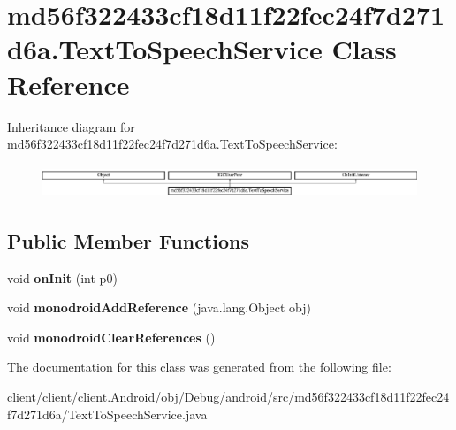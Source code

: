 \hypertarget{classmd56f322433cf18d11f22fec24f7d271d6a_1_1TextToSpeechService}{}\section{md56f322433cf18d11f22fec24f7d271d6a.\+Text\+To\+Speech\+Service Class Reference}
\label{classmd56f322433cf18d11f22fec24f7d271d6a_1_1TextToSpeechService}
Inheritance diagram for md56f322433cf18d11f22fec24f7d271d6a.\+Text\+To\+Speech\+Service\+:\begin{figure}[H]
\begin{center}
\leavevmode
\includegraphics[height=0.982456cm]{classmd56f322433cf18d11f22fec24f7d271d6a_1_1TextToSpeechService}
\end{center}
\end{figure}
\subsection*{Public Member Functions}
\begin{DoxyCompactItemize}
\item 
\hypertarget{classmd56f322433cf18d11f22fec24f7d271d6a_1_1TextToSpeechService_a526ebf9da1bdd3e252db08f2877065be}{}void {\bfseries on\+Init} (int p0)\label{classmd56f322433cf18d11f22fec24f7d271d6a_1_1TextToSpeechService_a526ebf9da1bdd3e252db08f2877065be}

\item 
\hypertarget{classmd56f322433cf18d11f22fec24f7d271d6a_1_1TextToSpeechService_a2ecbe417b614557ec468c6d8824a57d3}{}void {\bfseries monodroid\+Add\+Reference} (java.\+lang.\+Object obj)\label{classmd56f322433cf18d11f22fec24f7d271d6a_1_1TextToSpeechService_a2ecbe417b614557ec468c6d8824a57d3}

\item 
\hypertarget{classmd56f322433cf18d11f22fec24f7d271d6a_1_1TextToSpeechService_a0561482447310f91c1d25f7528771b8d}{}void {\bfseries monodroid\+Clear\+References} ()\label{classmd56f322433cf18d11f22fec24f7d271d6a_1_1TextToSpeechService_a0561482447310f91c1d25f7528771b8d}

\end{DoxyCompactItemize}


The documentation for this class was generated from the following file\+:\begin{DoxyCompactItemize}
\item 
client/client/client.\+Android/obj/\+Debug/android/src/md56f322433cf18d11f22fec24f7d271d6a/Text\+To\+Speech\+Service.\+java\end{DoxyCompactItemize}

